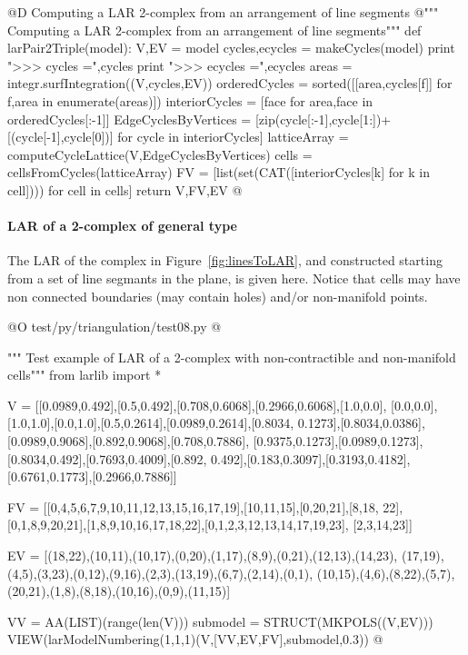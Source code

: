 \documentclass[11pt,oneside]{article}	%
\begin{document}
@D Computing a LAR 2-complex from an arrangement of line segments
@{""" Computing a LAR 2-complex from an arrangement of line segments"""
def larPair2Triple(model):
    V,EV = model
    cycles,ecycles = makeCycles(model)
    print "\n>>> cycles =",cycles
    print "\n>>> ecycles =",ecycles
    areas = integr.surfIntegration((V,cycles,EV))
    orderedCycles = sorted([[area,cycles[f]] for f,area in enumerate(areas)])
    interiorCycles = [face for area,face in orderedCycles[:-1]]
    EdgeCyclesByVertices = [zip(cycle[:-1],cycle[1:])+[(cycle[-1],cycle[0])] 
    							for cycle in interiorCycles]
    latticeArray = computeCycleLattice(V,EdgeCyclesByVertices)
    cells = cellsFromCycles(latticeArray)
    FV = [list(set(CAT([interiorCycles[k] for k in cell]))) for cell in cells]
    return V,FV,EV
@}



\paragraph{LAR of a 2-complex of general type}

The LAR of the complex in Figure~\ref{fig:linesToLAR}, and constructed starting from a set of line segmants in the plane, is given here. Notice that cells may have non connected boundaries (may contain holes) and/or non-manifold points.

@O test/py/triangulation/test08.py
@{""" Test example of LAR of a 2-complex with non-contractible and non-manifold cells"""
from larlib import *

V = [[0.0989,0.492],[0.5,0.492],[0.708,0.6068],[0.2966,0.6068],[1.0,0.0], 
[0.0,0.0],[1.0,1.0],[0.0,1.0],[0.5,0.2614],[0.0989,0.2614],[0.8034,
0.1273],[0.8034,0.0386],[0.0989,0.9068],[0.892,0.9068],[0.708,0.7886],
[0.9375,0.1273],[0.0989,0.1273],[0.8034,0.492],[0.7693,0.4009],[0.892,
0.492],[0.183,0.3097],[0.3193,0.4182],[0.6761,0.1773],[0.2966,0.7886]]

FV = [[0,4,5,6,7,9,10,11,12,13,15,16,17,19],[10,11,15],[0,20,21],[8,18,
22], [0,1,8,9,20,21],[1,8,9,10,16,17,18,22],[0,1,2,3,12,13,14,17,19,23],
[2,3,14,23]]

EV = [(18,22),(10,11),(10,17),(0,20),(1,17),(8,9),(0,21),(12,13),(14,23), 
(17,19),(4,5),(3,23),(0,12),(9,16),(2,3),(13,19),(6,7),(2,14),(0,1),
(10,15),(4,6),(8,22),(5,7),(20,21),(1,8),(8,18),(10,16),(0,9),(11,15)]

VV = AA(LIST)(range(len(V)))
submodel = STRUCT(MKPOLS((V,EV)))        
VIEW(larModelNumbering(1,1,1)(V,[VV,EV,FV],submodel,0.3)) 
@}
\end{document}
